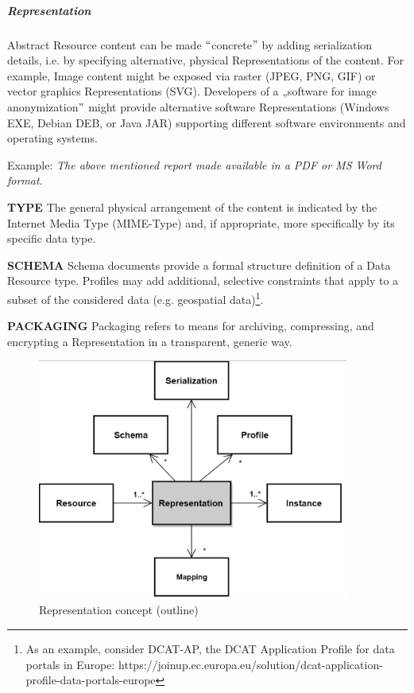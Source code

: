 

\subparagraph*{Representation}
Abstract Resource content can be made $``$concrete$"$  by adding serialization details, i.e. by specifying alternative, physical Representations of the content. For example, Image content might be exposed via raster (JPEG, PNG, GIF) or vector graphics Representations (SVG). Developers of a „software for image anonymization$"$  might provide alternative software Representations (Windows EXE, Debian DEB, or Java JAR) supporting different software environments and operating systems. 

Example: \textit{The above mentioned report made available in a PDF or MS Word format}. 

\textbf{TYPE} The general physical arrangement of the content is indicated by the Internet Media Type (MIME-Type) and, if appropriate, more specifically by its specific data type.

\textbf{SCHEMA} Schema documents provide a formal structure definition of a Data Resource type. Profiles may add additional, selective constraints that apply to a subset of the considered data (e.g. geospatial data)\footnote{As an example, consider DCAT-AP, the DCAT Application Profile for data portals in Europe: https://joinup.ec.europa.eu/solution/dcat-application-profile-data-portals-europe }.

\textbf{PACKAGING} Packaging refers to means for archiving, compressing, and encrypting a Representation in a transparent, generic way.




\begin{figure}[H]
	\begin{Center}
		\includegraphics[width=4.03in,height=3.12in]{./media/image36.png}
		\caption{Representation concept (outline)}
		\label{fig:Representation_concept_outline}
	\end{Center}
\end{figure}


